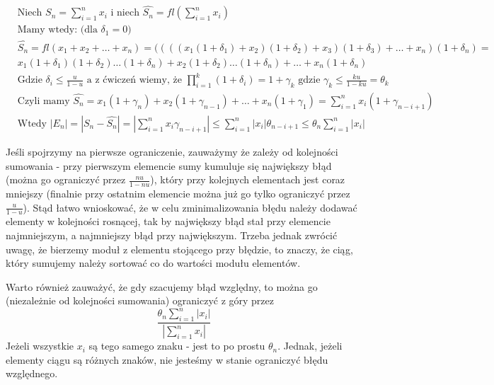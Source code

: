 \documentclass[11pt]{article}
\begin{document}
\begin{equation}
\begin{split}
	&\text{Niech } S_{n} = \sum_{i=1}^{n}x_i \text{ i niech } \hat{S_{n}} = fl(\sum_{i=1}^{n}x_i)\\
	&\text{Mamy wtedy: (dla $\delta_1 = 0$)}\\ 	
	&\hat{S_{n}} = fl(x_1 + x_2 + \dots + x_n) =  
	((((x_1(1 + \delta_1) + x_2)(1 + \delta_2) + x_3)(1 + \delta_3) + \dots + x_n)(1 + \delta_n) = \\
	&x_1(1 + \delta_1)(1 + \delta_2)\dots(1+\delta_n) + x_2(1 + \delta_2)\dots(1+\delta_n) + \dots + x_n(1 + \delta_n) \\
	&\text{Gdzie } \delta_i \leq \frac{u}{1-u} \text{ a z ćwiczeń wiemy, że } \prod_{i=1}^{k} (1 + \delta_i) = 1 + \gamma_k \text{ gdzie } \gamma_k \leq \frac{ku}{1-ku} = \theta_k\\
	&\text{Czyli mamy } \hat{S_{n}} = x_1(1 + \gamma_n) + x_2(1+\gamma_{n-1}) + \dots + x_n(1 + \gamma_1) = \sum_{i=1}^{n}x_i(1 + \gamma_{n-i+1})\\
	&\text{Wtedy } |E_n| = |S_n - \hat{S_n}| = |\sum_{i=1}^{n}x_i \gamma_{n-i+1} | \leq \sum_{i=1}^{n}|x_i| \theta_{n-i+1} \leq \theta_n \sum_{i=1}^{n}|x_i|
\end{split}
\end{equation}

Jeśli spojrzymy na pierwsze ograniczenie, zauważymy że zależy od kolejności sumowania - przy pierwszym elemencie sumy kumuluje się największy błąd (można go ograniczyć przez $\frac{nu}{1-nu}$), który przy kolejnych elementach jest coraz mniejszy (finalnie przy ostatnim elemencie można już go tylko ograniczyć przez $\frac{u}{1-u}$). Stąd łatwo wnioskować, że w celu zminimalizowania błędu należy dodawać elementy w kolejności rosnącej, tak by największy błąd stał przy elemencie najmniejszym, a najmniejszy błąd przy największym. Trzeba jednak zwrócić uwagę, że bierzemy moduł z elementu stojącego przy błędzie, to znaczy, że ciąg, który sumujemy należy sortować co do wartości modułu elementów.

Warto również zauważyć, że gdy szacujemy błąd względny, to można go (niezależnie od kolejności sumowania) ograniczyć z góry przez 
\begin{equation*}
	\frac{\theta_ n\sum_{i=1}^{n}|x_i|}{|\sum_{i=1}^{n}x_i|}
\end{equation*}
Jeżeli wszystkie $x_i$ są tego samego znaku - jest to po prostu $\theta_n$. Jednak, jeżeli elementy ciągu są różnych znaków, nie jesteśmy w stanie ograniczyć błędu względnego.
\end{document}
